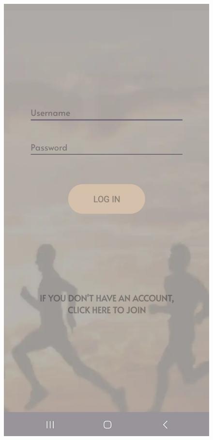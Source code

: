 \documentclass[12pt,oneside]{memoir}
\begin{document}
\begin{figure}[h]
  \centering
  \begin{minipage}{0.45\textwidth}
    \centering
    \includegraphics[scale=0.12]{assets/pictures/app_screenshots/login.jpg}

\end{minipage}
\end{figure}
\end{document}
